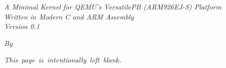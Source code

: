 \doublespacing
{}
\begin{titlepage}
    \begin{center}
        \vspace*{2in}
        \makeatletter
            {\Huge\bfseries \@title \par}
            \vspace{1em}
            \textit{A Minimal Kernel for QEMU's VersatilePB (ARM926EJ-S) Platform} \\
            \vspace{1em}
            \textit{Written in Modern C and ARM Assembly} \\
            \vspace{1em}
            \textit{Version 0.1} \\
            \vspace{1em}
            {\large \textit{By \@author} \par}
            \vspace{1em}
            {\small \@date {} \par}
              \vspace{1em}
        \makeatother
    \end{center}
\end{titlepage}

\setcounter{page}{2}

\newpage
\thispagestyle{empty}
\begin{center}
    \mbox{\textit{This page is intentionally left blank.}}
\end{center}